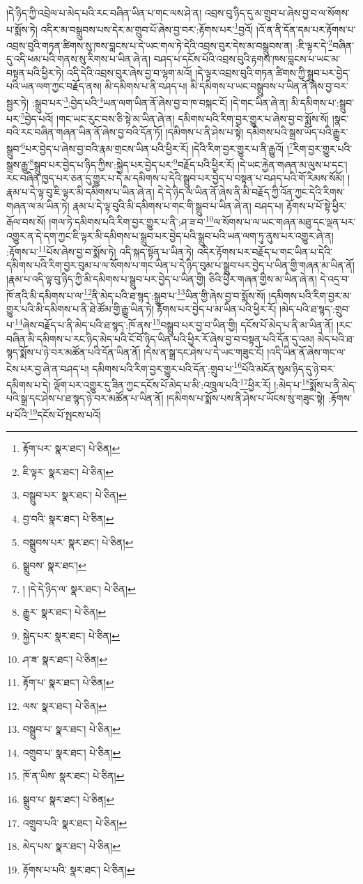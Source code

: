 །དེ་ཉིད་ཀྱི་འབྲེལ་པ་མེད་པའི་རང་བཞིན་ཡིན་པ་གང་ལས་ཤེ་ན། འབྲས་བུ་ཉིད་དུ་མ་གྲུབ་པ་ཞེས་བྱ་བ་ལ་སོགས་པ་སྨོས་ཏེ། འདིར་མ་བསྒྲུབས་པས་དེར་མ་གྲུབ་པོ་ཞེས་བྱ་བར་:རྟོགས་པར་\footnote{རྟོག་པར་  སྣར་ཐང་།  པེ་ཅིན། }བྱའོ། །འོ་ན་ནི་དོན་དམ་པར་རྟོགས་པ་འབྲས་བུའི་གཏན་ཚིགས་སུ་ཁས་བླངས་པ་དེ་ཡང་གལ་ཏེ་དེའི་འབྲས་བུར་དེས་མ་བསྒྲུབས་ན། :ཇི་ལྟར་དེ་\footnote{ཇི་ལྟར་  སྣར་ཐང་།  པེ་ཅིན། }བཞིན་དུ་འདི་ཕམ་པའི་གནས་སུ་རིགས་པ་ཡིན་ཞེ་ན། བཤད་པ་དངོས་པོའི་འབྲས་བུའི་རྟགས་ཁས་བླངས་པ་ཡང་མ་བསྟན་པའི་ཕྱིར་ཏེ། འདི་དེའི་འབྲས་བུར་ཞེས་བྱ་བ་ལྷག་མའོ། །དེ་ལྟར་འབྲས་བུའི་གཏན་ཚིགས་ཀྱི་སྒྲུབ་པར་བྱེད་པའི་ཡན་ལག་ཀྱང་བརྗོད་ནས། མི་དམིགས་པ་ནི་བཤད་པ། མི་དམིགས་པ་ཡང་བསྒྲུབས་པ་ཡིན་ནོ་ཞེས་བྱ་བར་སྦྱར་ཏེ། :སྒྲུབ་པར་\footnote{བསྒྲུབ་པར་  སྣར་ཐང་།  པེ་ཅིན། }:བྱེད་པའི་\footnote{བྱ་བའི་  སྣར་ཐང་།  པེ་ཅིན། }ཡན་ལག་ཡིན་ནོ་ཞེས་བྱ་བ་ཁ་བསྐང་ངོ། །དེ་གང་ཡིན་ཞེ་ན། མི་དམིགས་པ་:སྒྲུབ་པར་\footnote{བསྒྲུབས་པར་  སྣར་ཐང་།  པེ་ཅིན། }བྱེད་པའོ། །གང་ཡང་རུང་བས་ཅི་སྟེ་མ་ཡིན་ཞེ་ན། དམིགས་པའི་རིག་བྱར་གྱུར་པ་ཞེས་བྱ་བ་སྨོས་སོ། །སྣང་བའི་རང་བཞིན་གཞན་ཡིན་ནོ་ཞེས་བྱ་བའི་དོན་ཏོ། །དམིགས་པ་ནི་ཤེས་པ་སྟེ། དམིགས་པའི་སྒྲས་ཡོད་པའི་རྒྱུར་སྒྲུབ་\footnote{སྒྲུབས་  སྣར་ཐང་། }པར་བྱེད་པ་ཞེས་བྱ་བའི་རྣམ་གྲངས་ཡིན་པའི་ཕྱིར་རོ། །དེའི་རིག་བྱར་གྱུར་པ་ནི་རྒྱུའོ། །\footnote{། །དེ་དེ་ཉིད་ལ་  སྣར་ཐང་།  པེ་ཅིན། }རིག་བྱར་གྱུར་པའི་སྒྲས་རྒྱུ་\footnote{རྒྱུར་  སྣར་ཐང་།  པེ་ཅིན། }སྒྲུབ་པར་བྱེད་པ་ཉིད་ཀྱིས་:སྐྱེད་པར་བྱེད་པར་\footnote{སྐྱེད་པར་  སྣར་ཐང་།  པེ་ཅིན། }བརྗོད་པའི་ཕྱིར་རོ། །དེ་ཡང་རྐྱེན་གཞན་མ་ལུས་པ་དང་། རང་བཞིན་ཁྱད་པར་ཅན་དུ་གྱུར་པ་དེ་མ་དམིགས་པ་དེའི་སྒྲུབ་པར་བྱེད་པ་བསྟན་པ་བཤད་པའི་གོ་རིམས་སོམོ། །རྣམ་པ་དེ་ལྟ་བུ་ཇི་ལྟར་མི་དམིགས་པ་ཡིན་ཞེ་ན། དེ་དེ་ཉིད་ལ་ཡིན་ནོ་ཞེས་ནི་མི་བརྗོད་ཀྱི་འོན་ཀྱང་དེའི་རིགས་གཞན་ལ་མ་ཡིན་ཏེ། རྣམ་པ་དེ་ལྟ་བུའི་མི་དམིགས་པ་གང་གི་སྒྲུབ་པ་ཡིན་ཞེ་ན། བཤད་པ། རྟོགས་པ་པོ་སྟེ་ཕྱིར་རྒོལ་བས་སོ། །གལ་ཏེ་དམིགས་པའི་རིག་བྱར་གྱུར་པ་ནི་:ཤ་ཟ་བ་\footnote{ཤ་ཟ་  སྣར་ཐང་།  པེ་ཅིན། }ལ་སོགས་པ་ལ་ཡང་གཞན་མཐུ་དང་ལྡན་པར་འགྱུར་ན་དེ་དག་ཀྱང་ཇི་ལྟར་མི་དམིགས་པ་སྒྲུབ་པར་བྱེད་པའི་སྒྲུབ་པའི་ཡན་ལག་ཏུ་ནུས་པར་འགྱུར་ཞེ་ན། :རྟོགས་པ་\footnote{རྟོག་པ་  སྣར་ཐང་།  པེ་ཅིན། }པོས་ཞེས་བྱ་བ་སྨོས་ཏེ། འདི་སྐད་སྟོན་པ་ཡིན་ཏེ། འདིར་རྟོགས་པར་བརྗོད་པ་གང་ཡིན་པ་དེའི་དམིགས་པའི་རིག་བྱར་བུམ་པ་ལ་སོགས་པ་གང་ཡིན་པ་དེ་ཉིད་བུམ་པ་སྒྲུབ་པར་བྱེད་པ་ཡིན་གྱི་གཞན་མ་ཡིན་ནོ། །རྣམ་པ་འདི་ལྟ་བུ་ཉིད་ཀྱི་མི་དམིགས་པ་སྒྲུབ་པར་བྱེད་པ་ཡིན་གྱི། ཅིའི་ཕྱིར་གཞན་གྱིས་མ་ཡིན་ཞེ་ན། དེ་འདྲ་བ་ཁོ་ནའི་མི་དམིགས་པ་ལ་\footnote{ལས་  སྣར་ཐང་།  པེ་ཅིན། }ནི་མེད་པའི་ཐ་སྙད་:སྒྲུབ་པ་\footnote{བསྒྲུབ་པ་  སྣར་ཐང་།  པེ་ཅིན། }ཡིན་གྱི་ཞེས་བྱ་བ་སྨོས་སོ། །དམིགས་པའི་རིག་བྱར་མ་གྱུར་པའི་མི་དམིགས་པ་ནི་ཐེ་ཚོམ་གྱི་རྒྱུ་ཡིན་ཏེ། རྟོགས་པར་བྱེད་པ་མ་ཡིན་པའི་ཕྱིར་རོ། །མེད་པའི་ཐ་སྙད་:གྲུབ་པ་\footnote{འགྲུབ་པ་  སྣར་ཐང་།  པེ་ཅིན། }ཞེས་བརྗོད་པ་ནི་མེད་པའི་ཐ་སྙད་:ཁོ་ནས་\footnote{ཁོ་ན་ཡིས་  སྣར་ཐང་།  པེ་ཅིན། }བསྒྲུབ་པར་བྱ་བ་ཡིན་གྱི། དངོས་པོ་མེད་པ་ནི་མ་ཡིན་ནོ། །རང་བཞིན་མི་དམིགས་པ་རང་ཉིད་མེད་པའི་ངོ་བོ་ཉིད་ཡིན་པའི་ཕྱིར་རོ་ཞེས་བྱ་བ་བསྟན་པའི་དོན་དུ་འམ། མེད་པའི་ཐ་སྙད་སྨོས་པ་ཉེ་བར་མཚོན་པའི་དོན་ཡིན་ནོ། །དེས་ན་སྒྲ་དང་ཤེས་པ་དེ་ཡང་གཟུང་ངོ། །འདི་ཡིན་ནོ་ཞེས་གང་ལ་ངེས་པར་བྱ་ཞེ་ན་བཤད་པ། དམིགས་པའི་རིག་བྱར་གྱུར་པའི་དོན་:གྲུབ་པ་\footnote{སྒྲུབ་པ་  སྣར་ཐང་།  པེ་ཅིན། }པོའི་མངོན་སུམ་ཉིད་དུ་ཉེ་བར་དམིགས་པ་དེ། ལྡོག་པར་འགྱུར་དུ་ཟིན་ཀྱང་དངོས་པོ་མེད་པ་མི་:འཁྲུལ་པའི་\footnote{འགྲུབ་པའི་  སྣར་ཐང་།  པེ་ཅིན། }ཕྱིར་རོ། །:མེད་པ་\footnote{མེད་པས་  སྣར་ཐང་།  པེ་ཅིན། }སྨོས་པ་ནི་མེད་པའི་སྒྲ་དང་ཤེས་པ་ཐ་སྙད་ཉེ་བར་མཚོན་པ་ཡིན་ནོ། །དམིགས་པ་སྨོས་པས་ནི་ཤེས་པ་ཡོངས་སུ་གཟུང་སྟེ། :རྟོགས་པ་པོའི་\footnote{རྟོགས་པ་པའི་  སྣར་ཐང་།  པེ་ཅིན། }དངོས་པོ་སྤངས་པའོ། 